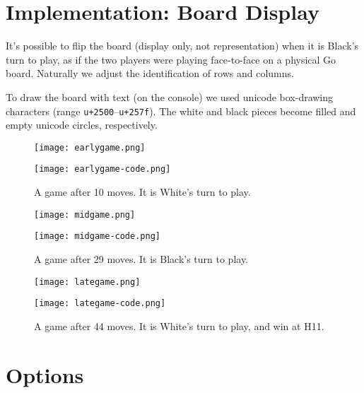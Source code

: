 \documentclass[12pt,a4paper,notitlepage]{article}
\begin{document}
\section{Implementation: Board Display}
\label{sec:boarddisplay}

It's possible to flip the board (display only, not representation) when it is Black's turn to play, as if the two players were playing face-to-face on a physical Go board. Naturally we adjust the identification of rows and columns.

To draw the board with text (on the console) we used unicode box-drawing characters (range \texttt{u+2500}--\texttt{u+257f}). The white and black pieces become filled and empty unicode circles, respectively.

\begin{figure}[bhtp]
	\begin{minipage}{0.45\textwidth}
	\texttt{[image: earlygame.png]}
	\end{minipage}
	\begin{minipage}{0.55\textwidth}
		\texttt{[image: earlygame-code.png]}
	\end{minipage}
	\caption{A game after 10 moves. It is White's turn to play.\label{fig:earlygame}}
\end{figure}

\begin{figure}[bhtp]
	\begin{minipage}{0.45\textwidth}
		\texttt{[image: midgame.png]}
	\end{minipage}
	\begin{minipage}{0.55\textwidth}
		\texttt{[image: midgame-code.png]}
	\end{minipage}
	\caption{A game after 29 moves. It is Black's turn to play.\label{fig:midgame}}
\end{figure}

\begin{figure}[bhtp]
	\begin{minipage}{0.45\textwidth}
		\texttt{[image: lategame.png]}
	\end{minipage}
	\begin{minipage}{0.55\textwidth}
		\texttt{[image: lategame-code.png]}
	\end{minipage}
	\caption{A game after 44 moves. It is White's turn to play, and win at H11.\label{fig:lategame}}
\end{figure}

\section{Options}
\end{document}
